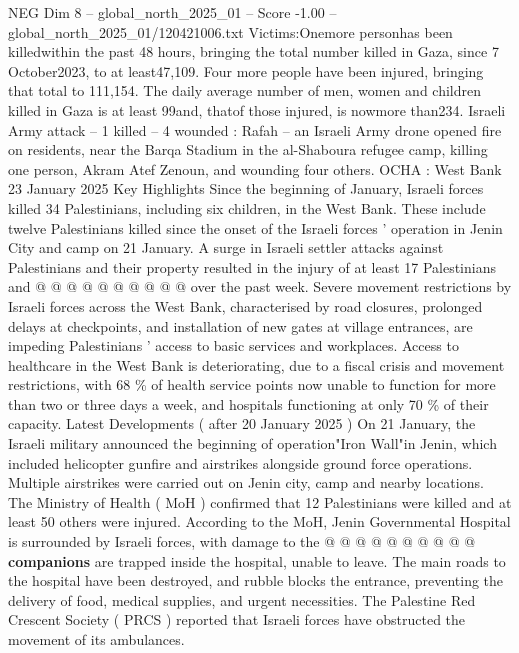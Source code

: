 \begin{textsample}{NEG Dim 8 – global\_north\_2025\_01 – Score -1.00 – global\_north\_2025\_01/120421006.txt}  \label{ex:f8_neg_164}
Victims:Onemore personhas been killedwithin the past 48 hours, bringing the total number killed in Gaza, since 7 October2023, to at least47,109.
Four more people have been injured, bringing that total to 111,154.
The daily average number of men, women and children killed in Gaza is at least 99and, thatof those injured, is nowmore than234.
Israeli Army attack -- 1 killed -- 4 wounded : Rafah -- an Israeli Army drone opened fire on residents, near the Barqa Stadium in the al-Shaboura refugee camp, killing one person, Akram Atef Zenoun, and wounding four others.
OCHA : West Bank 23 January 2025 Key Highlights Since the beginning of January, Israeli forces killed 34 Palestinians, including six children, in the West Bank.
These include twelve Palestinians killed since the onset of the Israeli forces ' operation in Jenin City and camp on 21 January.
A surge in Israeli settler attacks against Palestinians and their property resulted in the injury of at least 17 Palestinians and @ @ @ @ @ @ @ @ @ @ over the past week.
Severe movement restrictions by Israeli forces across the West Bank, characterised by road closures, prolonged delays at checkpoints, and installation of new gates at village entrances, are impeding Palestinians ' access to basic services and workplaces.
Access to healthcare in the West Bank is deteriorating, due to a fiscal crisis and movement restrictions, with 68 \% of health service points now unable to function for more than two or three days a week, and hospitals functioning at only 70 \% of their capacity.
Latest Developments ( after 20 January 2025 ) On 21 January, the Israeli military announced the beginning of operation"Iron Wall"in Jenin, which included helicopter gunfire and airstrikes alongside ground force operations.
Multiple airstrikes were carried out on Jenin city, camp and nearby locations.
The Ministry of Health ( MoH ) confirmed that 12 Palestinians were killed and at least 50 others were injured.
According to the MoH, Jenin Governmental Hospital is surrounded by Israeli forces, with damage to the @ @ @ @ @ @ @ @ @ @ \textbf{companions} are trapped inside the hospital, unable to leave.
The main roads to the hospital have been destroyed, and rubble blocks the entrance, preventing the delivery of food, medical supplies, and urgent necessities.
The Palestine Red Crescent Society ( PRCS ) reported that Israeli forces have obstructed the movement of its ambulances.

\end{textsample}
